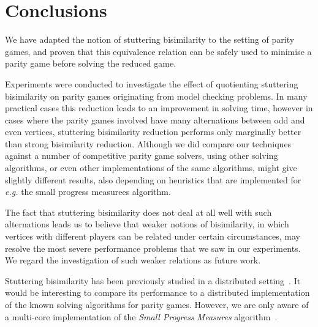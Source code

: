 \documentclass[a4paper]{llncs}
\newcommand{\eg}{\textit{e.g.}\xspace}
\begin{document}
\section{Conclusions}
\label{sec:conclusions}
We have adapted the notion of stuttering bisimilarity to the setting
of parity games, and proven that this equivalence relation can be
safely used to minimise a parity game before solving the reduced
game.

Experiments were conducted to investigate the effect of quotienting
stuttering bisimilarity on parity games originating from model checking
problems. In many practical cases this reduction leads to an improvement
in solving time, however in cases where the parity games involved have
many alternations between odd and even vertices, stuttering bisimilarity
reduction performs only marginally better than strong bisimilarity
reduction. Although we did compare our techniques against a number of
competitive parity game solvers, using other solving algorithms, or even other
implementations of the same algorithms, might give slightly different results,
also depending on heuristics that are implemented for \eg the small progress
measurees algorithm.

The fact that stuttering bisimilarity does not deal at all well with such
alternations leads us to believe that weaker notions of bisimilarity,
in which vertices with different players can be related under certain
circumstances, may resolve the most severe performance problems that
we saw in our experiments.  We regard the investigation of such weaker
relations as future work.

Stuttering bisimilarity has been previously studied in a distributed
setting~\cite{BO:03}. It would be interesting to compare its performance
to a distributed implementation of the known solving algorithms for
parity games. However, we are only aware of a multi-core implementation
of the \emph{Small Progress Measures} algorithm~\cite{PW:08}.



\end{document}
